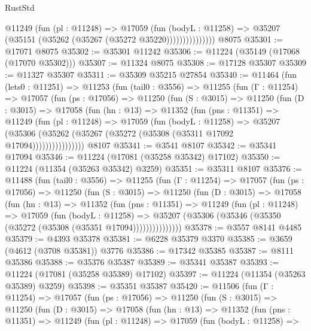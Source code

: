 \begin{lexlean}{RustStd}
\begin{coremodule}
                    @11249
                      (fun (pl : @11248) =>
                      @17059
                        (fun (bodyL : @11258) =>
                        @35207 (@35151 (@35262 (@35267 (@35272 @35220)))))))))))))))
    @8075
@35301 := @17071 @8075
@35302 := @35301 @11242
@35306 := @11224 (@35149 (@17068 (@17070 @35302)))
@35307 := @11324 @8075
@35308 := @17128 @35307
@35309 := @11327 @35307
@35311 := @35309 @35215 @27854
@35340 := @11464
    (fun (lets0 : @11251) =>
    @11253
      (fun (tail0 : @3556) =>
      @11255
        (fun (Γ : @11254) =>
        @17057
          (fun (ps : @17056) =>
          @11250
            (fun (S : @3015) =>
            @11250
              (fun (D : @3015) =>
              @17058
                (fun (hn : @13) =>
                @11352
                  (fun (pns : @11351) =>
                  @11249
                    (fun (pl : @11248) =>
                    @17059
                      (fun (bodyL : @11258) =>
                      @35207
                        (@35306
                          (@35262 (@35267 (@35272 (@35308 (@35311 @17092 @17094))))))))))))))))
    @8107
@35341 := @3541 @8107
@35342 := @35341 @17094
@35346 := @11224 (@17081 (@35258 @35342) @17102)
@35350 := @11224 (@11354 (@35263 @35342) @3259)
@35351 := @35311 @8107
@35376 := @11488
    (fun (tail0 : @3556) =>
    @11255
      (fun (Γ : @11254) =>
      @17057
        (fun (ps : @17056) =>
        @11250
          (fun (S : @3015) =>
          @11250
            (fun (D : @3015) =>
            @17058
              (fun (hn : @13) =>
              @11352
                (fun (pns : @11351) =>
                @11249
                  (fun (pl : @11248) =>
                  @17059
                    (fun (bodyL : @11258) =>
                    @35207 (@35306 (@35346 (@35350 (@35272 (@35308 (@35351 @17094)))))))))))))))
@35378 := @3557 @8141 @4485
@35379 := @4393 @35378
@35381 := @6228 @35379 @3370
@35385 := @3659 (@4612 (@3708 @35381)) @3776
@35386 := @17342 @35385
@35387 := @8111 @35386
@35388 := @35376 @35387
@35389 := @35341 @35387
@35393 := @11224 (@17081 (@35258 @35389) @17102)
@35397 := @11224 (@11354 (@35263 @35389) @3259)
@35398 := @35351 @35387
@35420 := @11506
    (fun (Γ : @11254) =>
    @17057
      (fun (ps : @17056) =>
      @11250
        (fun (S : @3015) =>
        @11250
          (fun (D : @3015) =>
          @17058
            (fun (hn : @13) =>
            @11352
              (fun (pns : @11351) =>
              @11249
                (fun (pl : @11248) =>
                @17059
                  (fun (bodyL : @11258) =>

\end{coremodule}
\end{lexlean}
